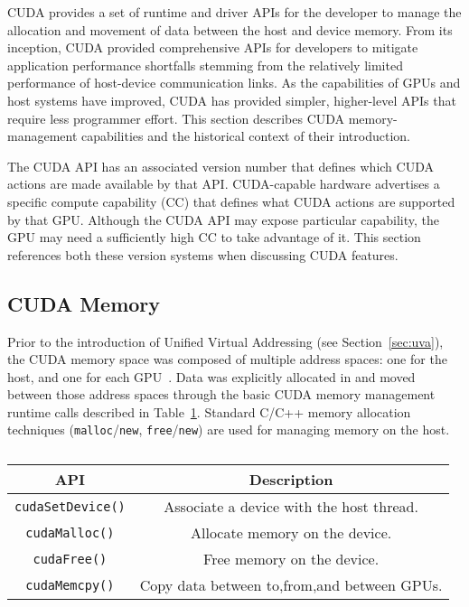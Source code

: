 CUDA provides a set of runtime and driver APIs for the developer to manage the allocation and movement of data between the host and device memory.
From its inception, CUDA provided comprehensive APIs for developers to mitigate application performance shortfalls stemming from the relatively limited performance of host-device communication links.
As the capabilities of GPUs and host systems have improved, CUDA has provided simpler, higher-level APIs that require less programmer effort.
This section describes CUDA memory-management capabilities and the historical context of their introduction.

The CUDA API has an associated version number that defines which CUDA actions are made available by that API.
CUDA-capable hardware advertises a specific compute capability (CC) that defines what CUDA actions are supported by that GPU.
Although the CUDA API may expose particular capability, the GPU may need a sufficiently high CC to take advantage of it.
This section references both these version systems when discussing CUDA features.

\subsection{CUDA Memory}

Prior to the introduction of Unified Virtual Addressing (see Section~\ref{sec:uva}), the CUDA memory space was composed of multiple address spaces: one for the host, and one for each GPU~\cite{schroeder2011peer}.
Data was explicitly allocated in and moved between those address spaces through the basic CUDA memory management runtime calls described in Table~\ref{tab:cuda-basic-apis}.
Standard C/C++ memory allocation techniques (\texttt{malloc}/\texttt{new}, \texttt{free}/\texttt{new}) are used for managing memory on the host.

\begin{table}[h]
	\centering
	\caption[Basic CUDA Memory-management APIs]{}
	\label{tab:cuda-basic-apis}
	\begin{tabular}{|c|c|}
		\hline
		\textbf{API}             & \textbf{Description}                        \\ \hline
		\texttt{cudaSetDevice()} & Associate a device with the host thread.    \\ \hline
		\texttt{cudaMalloc()}    & Allocate memory on the device.              \\ \hline
		\texttt{cudaFree()}      & Free memory on the device.                  \\ \hline
		\texttt{cudaMemcpy()}    & Copy data between to,from,and between GPUs. \\ \hline
	\end{tabular}
\end{table}

